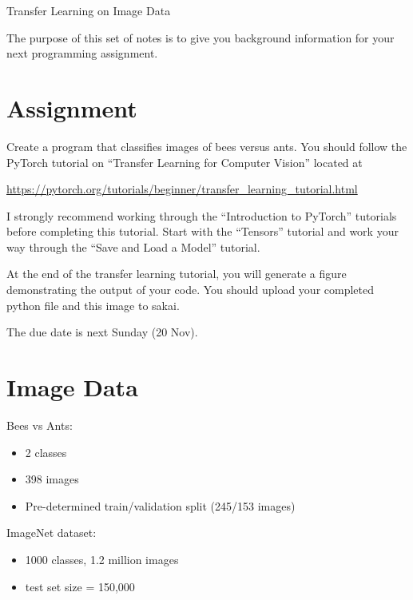 \documentclass[10pt]{exam}
\theoremstyle{definition}
\begin{document}
\begin{center}
{
\Huge
Transfer Learning on Image Data
}
\end{center}

The purpose of this set of notes is to give you background information for your next programming assignment.

\section{Assignment}

Create a program that classifies images of bees versus ants.
You should follow the PyTorch tutorial on ``Transfer Learning for Computer Vision'' located at

\url{https://pytorch.org/tutorials/beginner/transfer_learning_tutorial.html}

\noindent
I strongly recommend working through the ``Introduction to PyTorch'' tutorials before completing this tutorial.
Start with the ``Tensors'' tutorial and work your way through the ``Save and Load a Model'' tutorial.

At the end of the transfer learning tutorial, you will generate a figure demonstrating the output of your code.
You should upload your completed python file and this image to sakai.

The due date is next Sunday (20 Nov).

\section{Image Data}

Bees vs Ants:

\begin{itemize}
\item 2 classes

\item 398 images

\item Pre-determined train/validation split (245/153 images)
\end{itemize}

\noindent
ImageNet dataset:

\begin{itemize}
    \item 1000 classes, 1.2 million images

    \item test set size = 150,000

\end{itemize}
\end{document}
